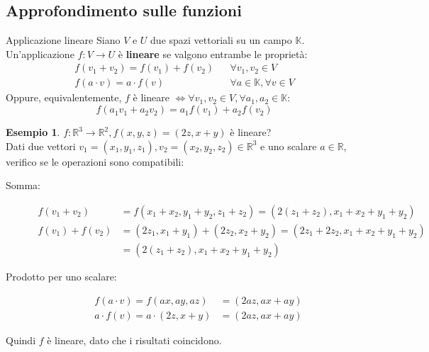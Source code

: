 \documentclass[a4paper]{article}
\theoremstyle{definition}
\newtheorem*{es}{Esempio}
\begin{document}
\subsection{Approfondimento sulle funzioni}
\begin{deff}{Applicazione lineare}{}
	Siano $V$ e $U$ due spazi vettoriali su un campo $\mathbb{K}$.
	Un'applicazione $f: V \rightarrow U$ è \textbf{lineare} se valgono entrambe le proprietà:
	\begin{align*}
		f(v_1 + v_2) = f(v_1) + f(v_2) &  & \forall v_1, v_2 \in V           \\
		f(a \cdot v) = a \cdot f(v)    &  & \forall a \in \mathbb{K}, \forall v \in V
	\end{align*}
	Oppure, equivalentemente, $f$ è lineare $\Leftrightarrow \forall v_1, v_2 \in V, \forall a_1, a_2 \in \mathbb{K}$:
	\begin{equation*}
		f(a_1v_1 + a_2v_2) = a_1f(v_1) + a_2f(v_2)
	\end{equation*}
\end{deff}
\begin{es}
	$f: \mathbb{R}^3 \rightarrow \mathbb{R}^2, f(x, y, z) = (2z, x + y)$ è lineare? \\
	Dati due vettori $v_1 = (x_1, y_1, z_1), v_2 = (x_2, y_2, z_2) \in \mathbb{R}^3$ e uno scalare $a \in \mathbb{R}$,
	verifico se le operazioni sono compatibili:
	\begin{description}
		\item[Somma:] 
		\begin{align*}
			f(v_1 + v_2)    & = f(x_1 + x_2, y_1 + y_2, z_1 + z_2) = (2(z_1 + z_2), x_1 + x_2 + y_1 + y_2)   \\
			f(v_1) + f(v_2) & = (2z_1, x_1 + y_1) + (2z_2, x_2 + y_2) = (2z_1 + 2z_2, x_1 + x_2 + y_1 + y_2) \\
							& = (2(z_1 + z_2), x_1 + x_2 + y_1 + y_2)
		\end{align*}
		\item[Prodotto per uno scalare:]
		\begin{align*}
			f(a \cdot v) = f(ax, ay, az)       & = (2az, ax + ay) \\
			a \cdot f(v) = a \cdot (2z, x + y) & = (2az, ax + ay)
		\end{align*}
	\end{description}
	Quindi $f$ è lineare, dato che i risultati coincidono.
\end{es}
\end{document}
